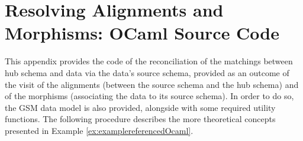 \chapter{Resolving Alignments and Morphisms: OCaml Source Code}\label{appendix:realignments}

This appendix provides the code of the reconciliation of the matchings between hub schema and data via the data's source schema, provided as an outcome of the visit of the alignments (between the source schema and the hub schema) and of the morphisms (associating the data to its source schema).  In order to do so, the GSM data model is also provided, alongside with some required utility functions. The following procedure describes the more theoretical concepts presented in Example \vref{ex:examplereferencedOcaml}.

